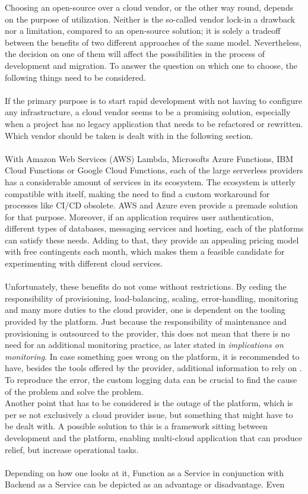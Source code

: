 \documentclass[a4paper,twoside,11pt, pagesize]{scrartcl}
\begin{document}
\begin{spacing}{1.2}
Choosing an open-source over a cloud vendor, or the other way round, depends on the purpose of utilization. Neither is the so-called vendor lock-in a drawback nor a limitation, compared to an open-source solution; it is solely a tradeoff between the benefits of two different approaches of the same model. Nevertheless, the decision on one of them will affect the possibilities in the process of development and migration. To answer the question on which one to choose, the following things need to be considered.\\\\ If the primary purpose is to start rapid development with not having to configure any infrastructure, a cloud vendor seems to be a promising solution, especially when a project has no legacy application that needs to be refactored or rewritten. Which vendor should be taken is dealt with in the following section.\\\\ With Amazon Web Services (AWS) Lambda, Microsofts Azure Functions, IBM Cloud Functions or Google Cloud Functions, each of the large serverless providers has a considerable amount of services in its ecosystem. The ecosystem is utterly compatible with itself, making the need to find a custom workaround for processes like CI/CD obsolete. AWS and Azure even provide a premade solution for that purpose. Moreover, if an application requires user authentication, different types of databases, messaging services and hosting, each of the platforms can satisfy these needs. Adding to that, they provide an appealing pricing model with free contingents each month, which makes them a feasible candidate for experimenting with different cloud services.\\\\ Unfortunately, these benefits do not come without restrictions. By ceding the responsibility of provisioning, load-balancing, scaling, error-handling, monitoring and many more duties to the cloud provider, one is dependent on the tooling provided by the platform. Just because the responsibility of maintenance and provisioning is outsourced to the provider, this does not mean that there is no need for an additional monitoring practice, as later stated in \textit{implications on monitoring}. In case something goes wrong on the platform, it is recommended to have, besides the tools offered by the provider, additional information to rely on \cite{manner2019troubleshooting}. To reproduce the error, the custom logging data can be crucial to find the cause of the problem and solve the problem.\\Another point that has to be considered is the outage of the platform, which is per se not exclusively a cloud provider issue, but something that might have to be dealt with. A possible solution to this is a framework sitting between development and the platform, enabling multi-cloud application that can produce relief, but increase operational tasks.\\\\ Depending on how one looks at it, Function as a Service in conjunction with Backend as a Service can be depicted as an advantage or disadvantage. Even 
\end{spacing}
\end{document}
